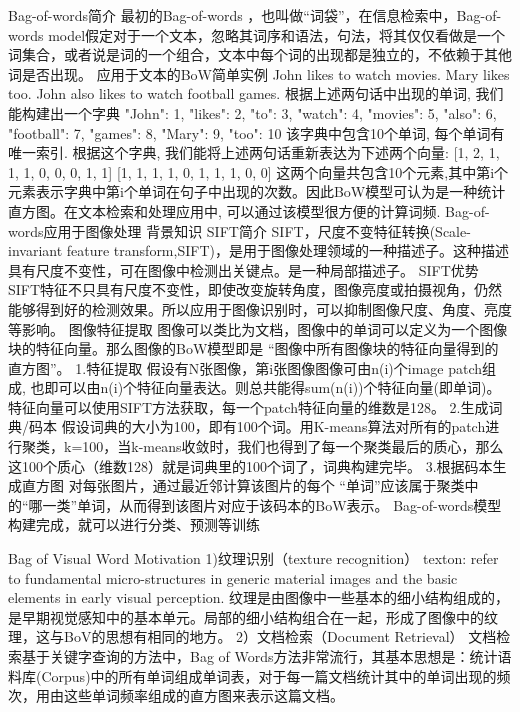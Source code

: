 \documentclass[10pt,a4paper]{ctexbook}
\begin{document}
Bag-of-words简介
最初的Bag-of-words ，也叫做“词袋”，在信息检索中，Bag-of-words model假定对于一个文本，忽略其词序和语法，句法，将其仅仅看做是一个词集合，或者说是词的一个组合，文本中每个词的出现都是独立的，不依赖于其他词是否出现。
应用于文本的BoW简单实例
John likes to watch movies. Mary likes too.
John also likes to watch football games.
根据上述两句话中出现的单词, 我们能构建出一个字典
{"John": 1, "likes": 2, "to": 3, "watch": 4, "movies": 5, "also": 6, "football": 7, "games": 8, "Mary": 9, "too": 10}
该字典中包含10个单词, 每个单词有唯一索引. 根据这个字典, 我们能将上述两句话重新表达为下述两个向量:
[1, 2, 1, 1, 1, 0, 0, 0, 1, 1]
[1, 1, 1, 1, 0, 1, 1, 1, 0, 0]
这两个向量共包含10个元素,其中第i个元素表示字典中第i个单词在句子中出现的次数。因此BoW模型可认为是一种统计直方图。在文本检索和处理应用中, 可以通过该模型很方便的计算词频.
Bag-of-words应用于图像处理
背景知识
SIFT简介
SIFT，尺度不变特征转换(Scale-invariant feature transform,SIFT)，是用于图像处理领域的一种描述子。这种描述具有尺度不变性，可在图像中检测出关键点。是一种局部描述子。
SIFT优势
SIFT特征不只具有尺度不变性，即使改变旋转角度，图像亮度或拍摄视角，仍然能够得到好的检测效果。所以应用于图像识别时，可以抑制图像尺度、角度、亮度等影响。
图像特征提取
图像可以类比为文档，图像中的单词可以定义为一个图像块的特征向量。那么图像的BoW模型即是 “图像中所有图像块的特征向量得到的直方图”。
1.特征提取
假设有N张图像，第i张图像图像可由n(i)个image patch组成, 也即可以由n(i)个特征向量表达。则总共能得sum(n(i))个特征向量(即单词)。
特征向量可以使用SIFT方法获取，每一个patch特征向量的维数是128。
2.生成词典/码本
假设词典的大小为100，即有100个词。用K-means算法对所有的patch进行聚类，k=100，当k-means收敛时，我们也得到了每一个聚类最后的质心，那么这100个质心（维数128）就是词典里的100个词了，词典构建完毕。
3.根据码本生成直方图
对每张图片，通过最近邻计算该图片的每个 “单词”应该属于聚类中的“哪一类”单词，从而得到该图片对应于该码本的BoW表示。
Bag-of-words模型构建完成，就可以进行分类、预测等训练



Bag of Visual Word
Motivation
 1)纹理识别（texture recognition）
 texton: refer to fundamental micro-structures in generic material images and the basic elements in early visual perception.
 纹理是由图像中一些基本的细小结构组成的，是早期视觉感知中的基本单元。局部的细小结构组合在一起，形成了图像中的纹理，这与BoV的思想有相同的地方。
 2）文档检索（Document Retrieval）
 文档检索基于关键字查询的方法中，Bag of Words方法非常流行，其基本思想是：统计语料库(Corpus)中的所有单词组成单词表，对于每一篇文档统计其中的单词出现的频次，用由这些单词频率组成的直方图来表示这篇文档。
\end{document}
